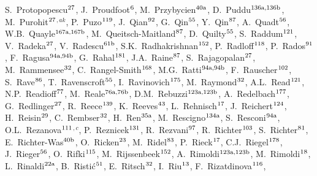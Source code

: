 \begin{flushleft}
S.~Protopopescu$^\textrm{\scriptsize 27}$,
J.~Proudfoot$^\textrm{\scriptsize 6}$,
M.~Przybycien$^\textrm{\scriptsize 40a}$,
D.~Puddu$^\textrm{\scriptsize 136a,136b}$,
M.~Purohit$^\textrm{\scriptsize 27}$$^{,ak}$,
P.~Puzo$^\textrm{\scriptsize 119}$,
J.~Qian$^\textrm{\scriptsize 92}$,
G.~Qin$^\textrm{\scriptsize 55}$,
Y.~Qin$^\textrm{\scriptsize 87}$,
A.~Quadt$^\textrm{\scriptsize 56}$,
W.B.~Quayle$^\textrm{\scriptsize 167a,167b}$,
M.~Queitsch-Maitland$^\textrm{\scriptsize 87}$,
D.~Quilty$^\textrm{\scriptsize 55}$,
S.~Raddum$^\textrm{\scriptsize 121}$,
V.~Radeka$^\textrm{\scriptsize 27}$,
V.~Radescu$^\textrm{\scriptsize 61b}$,
S.K.~Radhakrishnan$^\textrm{\scriptsize 152}$,
P.~Radloff$^\textrm{\scriptsize 118}$,
P.~Rados$^\textrm{\scriptsize 91}$,
F.~Ragusa$^\textrm{\scriptsize 94a,94b}$,
G.~Rahal$^\textrm{\scriptsize 181}$,
J.A.~Raine$^\textrm{\scriptsize 87}$,
S.~Rajagopalan$^\textrm{\scriptsize 27}$,
M.~Rammensee$^\textrm{\scriptsize 32}$,
C.~Rangel-Smith$^\textrm{\scriptsize 168}$,
M.G.~Ratti$^\textrm{\scriptsize 94a,94b}$,
F.~Rauscher$^\textrm{\scriptsize 102}$,
S.~Rave$^\textrm{\scriptsize 86}$,
T.~Ravenscroft$^\textrm{\scriptsize 55}$,
I.~Ravinovich$^\textrm{\scriptsize 175}$,
M.~Raymond$^\textrm{\scriptsize 32}$,
A.L.~Read$^\textrm{\scriptsize 121}$,
N.P.~Readioff$^\textrm{\scriptsize 77}$,
M.~Reale$^\textrm{\scriptsize 76a,76b}$,
D.M.~Rebuzzi$^\textrm{\scriptsize 123a,123b}$,
A.~Redelbach$^\textrm{\scriptsize 177}$,
G.~Redlinger$^\textrm{\scriptsize 27}$,
R.~Reece$^\textrm{\scriptsize 139}$,
K.~Reeves$^\textrm{\scriptsize 43}$,
L.~Rehnisch$^\textrm{\scriptsize 17}$,
J.~Reichert$^\textrm{\scriptsize 124}$,
H.~Reisin$^\textrm{\scriptsize 29}$,
C.~Rembser$^\textrm{\scriptsize 32}$,
H.~Ren$^\textrm{\scriptsize 35a}$,
M.~Rescigno$^\textrm{\scriptsize 134a}$,
S.~Resconi$^\textrm{\scriptsize 94a}$,
O.L.~Rezanova$^\textrm{\scriptsize 111}$$^{,c}$,
P.~Reznicek$^\textrm{\scriptsize 131}$,
R.~Rezvani$^\textrm{\scriptsize 97}$,
R.~Richter$^\textrm{\scriptsize 103}$,
S.~Richter$^\textrm{\scriptsize 81}$,
E.~Richter-Was$^\textrm{\scriptsize 40b}$,
O.~Ricken$^\textrm{\scriptsize 23}$,
M.~Ridel$^\textrm{\scriptsize 83}$,
P.~Rieck$^\textrm{\scriptsize 17}$,
C.J.~Riegel$^\textrm{\scriptsize 178}$,
J.~Rieger$^\textrm{\scriptsize 56}$,
O.~Rifki$^\textrm{\scriptsize 115}$,
M.~Rijssenbeek$^\textrm{\scriptsize 152}$,
A.~Rimoldi$^\textrm{\scriptsize 123a,123b}$,
M.~Rimoldi$^\textrm{\scriptsize 18}$,
L.~Rinaldi$^\textrm{\scriptsize 22a}$,
B.~Risti\'{c}$^\textrm{\scriptsize 51}$,
E.~Ritsch$^\textrm{\scriptsize 32}$,
I.~Riu$^\textrm{\scriptsize 13}$,
F.~Rizatdinova$^\textrm{\scriptsize 116}$,

\end{flushleft}
